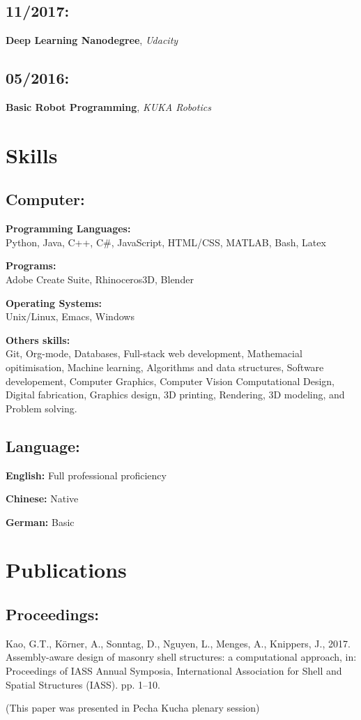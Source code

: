 \documentclass[a4paper, 9pt]{article}
\begin{document}
\subsection{11/2017:}
\label{sec:org695117e}
\textbf{Deep Learning Nanodegree}, \emph{Udacity}

\subsection{05/2016:}
\label{sec:orgd72f916}
\textbf{Basic Robot Programming}, \emph{KUKA Robotics}


\section{Skills}
\label{sec:orgb52e86f}
\subsection{Computer:}
\label{sec:org9b2af5e}
\textbf{Programming Languages:} \\
Python, Java, C++, C\#, JavaScript, HTML/CSS, MATLAB, Bash, Latex

\textbf{Programs:} \\
Adobe Create Suite, Rhinoceros3D, Blender

\textbf{Operating Systems:} \\
Unix/Linux, Emacs, Windows

\textbf{Others skills:} \\
Git, Org-mode, Databases, Full-stack web development, Mathemacial opitimisation, Machine learning,
Algorithms and data structures, Software developement, Computer Graphics, Computer Vision
Computational Design, Digital fabrication, Graphics design, 3D printing, Rendering, 
3D modeling, and Problem solving. 


\subsection{Language:}
\label{sec:org70afaf6}
\textbf{English:} Full professional proficiency

\textbf{Chinese:} Native

\textbf{German:} Basic


\section{Publications}
\label{sec:org0bb5c26}
\subsection{Proceedings:}
\label{sec:orgfb84571}
Kao, G.T., Körner, A., Sonntag, D., Nguyen, L., Menges, A., Knippers, J., 2017. 
Assembly-aware design of masonry shell structures: 
a computational approach, in: Proceedings of IASS Annual Symposia, 
International Association for Shell and Spatial Structures (IASS). pp. 1–10.

(This paper was presented in Pecha Kucha plenary session)
\end{document}
